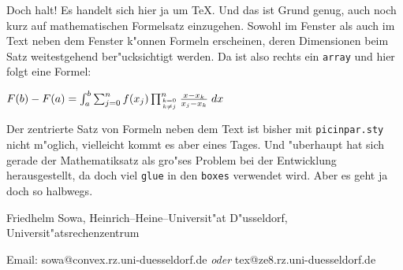 \documentclass[a4paper]{article}
\begin{document}
\begin{window}[3,r,{\arraycolsep=2.5pt \def\arraystretch{.75}
$\left(\begin{array}{ccccccccc}%
	 *&*&*&*&&&&&\\
        **&*&*&*&*&&&&\\ \cline{3-6}
	 *&*&\multicolumn{1}{|c}{*}&*&*&\multicolumn{1}{c|}{*}&&&\\
	 &*&\multicolumn{1}{|c}{*}&*&*&\multicolumn{1}{c|}{*}&*&&\\
	 &&\multicolumn{1}{|c}{*}&*&*&\multicolumn{1}{c|}{*}&*&*&\\ \cline{3-6}
	 &&&*&*&*&*&*&*\\
	 &&&&*&*&*&*&*\\
	 &&&&&*&*&*&*\\
	 &&&&&&*&*&*
	 \end{array}
   \right)$},{}]
Doch halt! Es handelt sich hier ja um \TeX{}. Und das ist Grund genug, auch
noch kurz auf mathematischen Formelsatz einzugehen. Sowohl im Fenster als
auch im Text neben dem Fenster k"onnen Formeln erscheinen, deren Dimensionen
beim Satz weitestgehend ber"ucksichtigt werden. Da ist also rechts ein
{\tt array} und hier folgt eine Formel:

\def\formel#1#2#3#4#5{#1(#4)-#1(#3)=
\int_{#3}^{#4}\sum_{j=0}^{#5}#2(x_j)
\prod_{{k=0}\atop{k\not= j}}^{#5}
{x-x_k\over x_j-x_k}\; dx}
$\formel Ffabn$

Der zentrierte Satz von Formeln neben dem Text ist bisher mit
{\tt picinpar.sty} nicht m"oglich, vielleicht kommt es aber eines
Tages. Und "uberhaupt hat sich gerade der Mathematiksatz als gro"ses
Problem bei der Entwicklung herausgestellt, da doch viel {\tt glue} in
den {\tt boxes} verwendet wird. Aber es geht ja doch so halbwegs.
\end{window}
\vfill
\centerline{Friedhelm Sowa, Heinrich--Heine--Universit"at D"usseldorf,
Universit"atsrechenzentrum}
\centerline{Email: sowa@convex.rz.uni-duesseldorf.de {\sl oder}
tex@ze8.rz.uni-duesseldorf.de}
\end{document}
